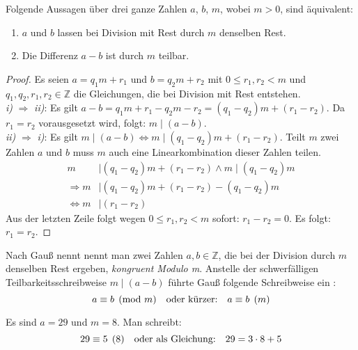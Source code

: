 \begin{lemma}
  Folgende Aussagen über drei ganze Zahlen $a$, $b$, $m$, wobei $m > 0$, sind äquivalent:
  \begin{enumerate}[label=\roman*)]
    \item $a$ und $b$ lassen bei Division mit Rest durch $m$ denselben Rest.
    \item Die Differenz $a - b$ ist durch $m$ teilbar.
  \end{enumerate}
\end{lemma}
\begin{proof}
  Es seien $a = q_1m + r_1$ und $b = q_2m + r_2$ mit $0 \leq r_1,r_2 < m$
  und  $q_1,q_2,r_1,r_2 \in \mathbb{Z}$ die Gleichungen,
  die bei Division mit Rest entstehen. \\
  \textit{i)} $\Rightarrow$ \textit{ii)}:
  Es gilt $a - b = q_1m + r_1 - q_2m - r_2 = (q_1 - q_2)m + (r_1 - r_2)$.
  Da $r_1 = r_2$ vorausgesetzt wird, folgt: $m \mid (a - b)$. \\
  \textit{ii)} $\Rightarrow$ \textit{i)}:
  Es gilt $m \mid (a - b) \Leftrightarrow m \mid (q_1 - q_2)m + (r_1 - r_2)$.
  Teilt $m$ zwei Zahlen $a$ und $b$ muss $m$ auch eine Linearkombination dieser Zahlen teilen.
  \begin{align*}
    m                 & \mid (q_1 - q_2)m + (r_1 - r_2) \wedge m \mid (q_1 - q_2)m \\
    \Rightarrow m     & \mid (q_1 - q_2)m + (r_1 - r_2) - (q_1 - q_2)m             \\
    \Leftrightarrow m & \mid (r_1 - r_2)
  \end{align*}
  Aus der letzten Zeile folgt wegen $0 \leq r_1,r_2 < m$ sofort: $r_1 - r_2 = 0$.
  Es folgt: $r_1 = r_2$.
\end{proof}

\noindent
Nach Gauß nennt nennt man zwei Zahlen $a, b \in \mathbb{Z}$, die bei der Division durch $m$
denselben Rest ergeben, \textit{kongruent Modulo m}. Anstelle der schwerfälligen
Teilbarkeitsschreibweise $m \mid (a - b)$
führte Gauß folgende Schreibweise ein \parencite[180]{BOOK:numberTheory}:
\begin{equation}
  \label{eq:kongruenz}
  a \equiv b \pmod{m} \text{\quad oder kürzer:\quad} a \equiv b \pod{m}
\end{equation}

\begin{example}
  Es sind $a = 29$ und $m = 8$. Man schreibt:
  \begin{equation*}
    29 \equiv 5 \pod{8} \text{\quad oder als Gleichung:\quad} 29 = 3 \cdot 8 + 5 \qedhere
  \end{equation*}
\end{example}

